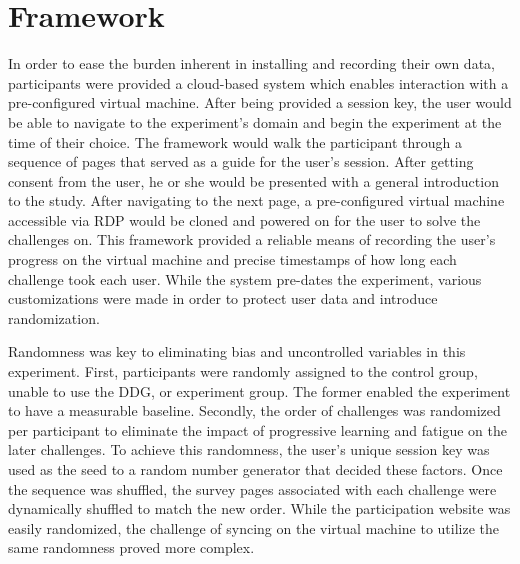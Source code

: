 \section{Framework}
In order to ease the burden inherent in installing  and recording their own data, participants were provided a cloud-based system which enables interaction with a pre-configured virtual machine. After being provided a session key, the user would be able to navigate to the experiment’s domain and begin the experiment at the time of their choice. The framework would walk the participant through a sequence of pages that served as a guide for the user’s session. After getting consent from the user, he or she would be presented with a general introduction to the study. After navigating to the next page, a pre-configured virtual machine accessible via RDP would be cloned and powered on for the user to solve the challenges on. This framework provided a reliable means of recording the user’s progress on the virtual machine and precise timestamps of how long each challenge took each user.  While the system pre-dates the experiment, various customizations were made in order to protect user data and introduce randomization. 

Randomness was key to eliminating bias and uncontrolled variables in this experiment. First, participants were randomly assigned to the control group, unable to use the DDG, or experiment group. The former enabled the experiment to have a measurable baseline. Secondly, the order of challenges was randomized per participant to eliminate the impact of progressive learning and fatigue on the later challenges. To achieve this randomness, the user’s unique session key was used as the seed to a random number generator that decided these factors. Once the sequence was shuffled, the survey pages associated with each challenge were dynamically shuffled to match the new order. While the participation website was easily randomized, the challenge of syncing  on the virtual machine to utilize the same randomness proved more complex.

